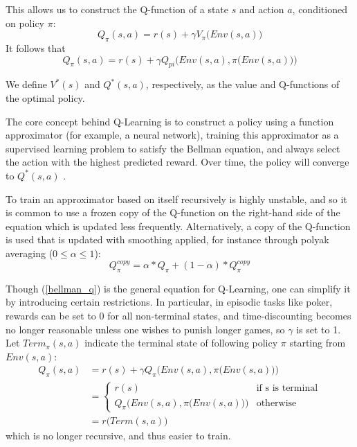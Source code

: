 This allows us to construct the Q-function of a state $s$ and action $a$, conditioned on policy $\pi$:
\begin{equation}
    Q_{\pi}(s, a) = r(s) + \gamma V_{\pi}\big(Env(s, a)\big)
\end{equation}
It follows that
\begin{equation}
\label{bellman_q}
    Q_{\pi}(s, a) = r(s) + \gamma Q_{pi}\Big(Env(s, a), \pi\big(Env(s, a)\big)\Big)
\end{equation}

We define $V^*(s)$ and $Q^*(s, a)$, respectively, as the value and Q-functions of the optimal policy.

The core concept behind Q-Learning is to construct a policy using a function approximator (for example, a neural network), training this approximator as a supervised learning problem to satisfy the Bellman equation, and always select the action with the highest predicted reward.
Over time, the policy will converge to $Q^*(s, a)$ \cite{Qlearn_convergence}.

To train an approximator based on itself recursively is highly unstable, and so it is common to use a frozen copy of the Q-function on the right-hand side of the equation which is updated less frequently. Alternatively, a copy of the Q-function is used that is updated with smoothing applied, for instance through polyak averaging ($0 \leq \alpha \leq 1$):
\begin{equation}
    Q_{\pi}^{copy} = \alpha * Q_{\pi} + (1 - \alpha) * Q_{\pi}^{copy}
\end{equation}

Though (\ref{bellman_q}) is the general equation for Q-Learning, one can simplify it by introducing certain restrictions. In particular, in episodic tasks like poker, rewards can be set to 0 for all non-terminal states, and time-discounting becomes no longer reasonable unless one wishes to punish longer games, so $\gamma$ is set to 1. Let $Term_{\pi}(s, a)$ indicate the terminal state of following policy $\pi$ starting from $Env(s, a)$:
\begin{equation}
\begin{split}
Q_{\pi}(s, a) &= r(s) + \gamma Q_{\pi}\Big(Env(s, a), \pi\big(Env(s, a)\big)\Big)\\
&= \begin{cases}
r(s) &\mbox{if s is terminal} \\
Q_{\pi}\Big(Env(s, a), \pi\big(Env(s, a)\big)\Big) &\mbox{otherwise}
\end{cases}\\
&= r\big(Term(s, a)\big)
\end{split}
\end{equation}
which is no longer recursive, and thus easier to train.

